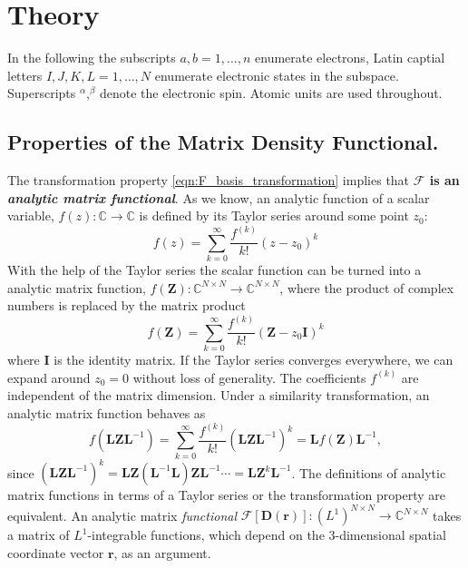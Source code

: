 \documentclass[journal=jpclcd,manuscript=letter]{achemso}
\newcommand\m[1]{\mathbf{#1}}
\renewcommand\vec[1]{\mathbf{#1}}
\begin{document}
\section{Theory}
In the following the subscripts $a,b = 1,\ldots,n$ enumerate electrons, Latin captial letters $I,J,K,L = 1,\ldots,N$
enumerate electronic states in the subspace.
Superscripts $^\alpha$,$^\beta$ denote the electronic spin. Atomic units are used throughout.

\subsection{Properties of the Matrix Density Functional.
\label{sec:properties_analytic_matrix_functional}
}

The transformation property \ref{eqn:F_basis_transformation} implies that \textbf{$\mathcal{F}$ is an \emph{analytic matrix functional}}.
As we know, an analytic function of a scalar variable, $f(z): \mathbb{C} \to \mathbb{C}$ is defined by its Taylor series around some point $z_0$:
\begin{equation}
f(z) = \sum_{k=0}^{\infty} \frac{f^{(k)}}{k!} (z-z_0)^k
\end{equation}
With the help of the Taylor series the scalar function can be turned into a analytic matrix function, $f(\m{Z}): \mathbb{C}^{N \times N} \to \mathbb{C}^{N \times N}$, where the product of complex numbers is replaced by the matrix product
\begin{equation}
f(\m{Z}) = \sum_{k=0}^{\infty} \frac{f^{(k)}}{k!} (\m{Z} - z_0 \m{I})^k
\end{equation}
where $\m{I}$ is the identity matrix. If the Taylor series converges everywhere, we can expand around $z_0 = 0$ without loss of generality.
The coefficients $f^{(k)}$ are independent of the matrix dimension. Under a similarity transformation, an analytic matrix function behaves as
\begin{equation}
  f(\m{L} \m{Z} \m{L}^{-1}) = \sum_{k=0}^{\infty} \frac{f^{(k)}}{k!} (\m{L} \m{Z} \m{L}^{-1})^k = \m{L} f(\m{Z}) \m{L}^{-1},
\end{equation}
since $(\m{L} \m{Z} \m{L}^{-1})^k = \m{L} \m{Z} (\m{L}^{-1} \m{L}) \m{Z} \m{L}^{-1} \cdots = \m{L} \m{Z}^k \m{L}^{-1}$.
The definitions of analytic matrix functions in terms of a Taylor series or the transformation property are equivalent. \cite{Rinehart1955} 
An analytic matrix \emph{functional} $\mathcal{F}[\m{D}(\vec{r})] : (L^1)^{N \times N} \to \mathbb{C}^{N \times N}$ takes a matrix of $L^1$-integrable functions, which depend on the 3-dimensional spatial coordinate vector $\vec{r}$, as an argument.
\end{document}
